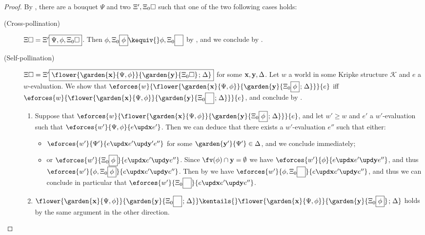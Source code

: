 \begin{scope}
\begin{proof}
  By , there are a bouquet $\Psi$ and two  $\Xi',
  \Xi_0\square$ such that one of the two following cases holds:
  \begin{description}
    \item[(Cross-pollination)] $\Xi\square = \Xi'\fbox{$\Psi, \phi,
    \Xi_0\square$}$. Then $\phi, \Xi_0\select{\phi} \kequiv{} \phi,
    \Xi_0\select{\phantom\phi}$ by , and we
    conclude by .
    \item[(Self-pollination)] $\Xi\hole =
    \Xi'\select{\flower{\garden{\bx}{\Psi,
    \phi}}{\garden{\by}{\Xi_0\hole} \sep \Delta}}$ for some
    $\mathbf{x},\mathbf{y},\Delta$. Let $w$ a world in some Kripke
    structure $\mathcal{K}$ and $e$ a $w$-evaluation. We show that
    $\eforces{w}{\flower{\garden{\bx}{\Psi,
    \phi}}{\garden{\by}{\Xi_0\select{\phi} \sep \Delta}}}{e}$ iff
    $\eforces{w}{\flower{\garden{\bx}{\Psi,
    \phi}}{\garden{\by}{\Xi_0\select{\phantom{\phi}} \sep \Delta}}}{e}$,
    and conclude by .
    \begin{enumerate}
      \item Suppose that $\eforces{w}{\flower{\garden{\bx}{\Psi,
      \phi}}{\garden{\by}{\Xi_0\select{\phi} \sep \Delta}}}{e}$, and let
      $w' \geq w$ and $e'$ a $w'$-evaluation such that $\eforces{w'}{\Psi,
      \phi}{\update{e}{\bx}{e'}}$. Then we can deduce that there exists a
      $w'$-evaluation $e''$ such that either:
      \begin{itemize}
        \item
        $\eforces{w'}{\Psi'}{\update{e}{\bx}{\update{e'}{\mathbf{y'}}{e''}}}$
        for some $\garden{\mathbf{y'}}{\Psi'} \in \Delta$, and we conclude
        immediately;
        \item
        or
        $\eforces{w'}{\Xi_0\select{\phi}}{\update{e}{\bx}{\update{e'}{\by}{e''}}}$.
        Since $\fv(\phi) \cap \by = \emptyset$ we have
        $\eforces{w'}{\phi}{\update{e}{\bx}{\update{e'}{\by}{e''}}}$,
        and thus $\eforces{w'}{\phi,
        \Xi_0\select{\phi}}{\update{e}{\bx}{\update{e'}{\by}{e''}}}$.
        Then by  we have $\eforces{w'}{\phi,
        \Xi_0\select{\phantom{\phi}}}{\update{e}{\bx}{\update{e'}{\by}{e''}}}$,
        and thus we can conclude in particular that
        $\eforces{w'}{\Xi_0\select{\phantom{\phi}}}{\update{e}{\bx}{\update{e'}{\by}{e''}}}$.
      \end{itemize}
    \item $\flower{\garden{\bx}{\Psi,
    \phi}}{\garden{\by}{\Xi_0\select{\phantom{\phi}} \sep \Delta}}
    \kentails{}\flower{\garden{\bx}{\Psi,
    \phi}}{\garden{\by}{\Xi_0\select{\phi}} \sep \Delta}$ holds by the same
    argument in the other direction.
    \end{enumerate}
  \end{description}
\end{proof}


\end{scope}

